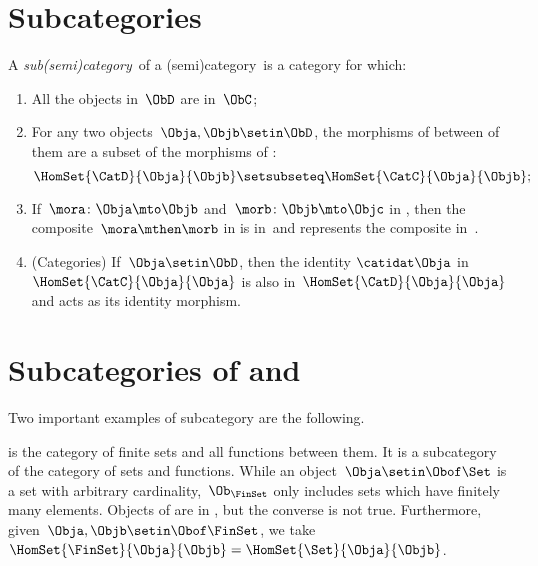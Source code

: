 
\section{Subcategories}
\label{sec:subcategories}


\begin{ctdefinition}[Subcategory]
    \label{def:subcategory}
    A \emph{sub(semi)category}~\CatD of a (semi)category~\CatC is a category for which:
    \begin{enumerate}
        \item All the objects in~$\ObD$ are in~$\ObC$;
        \item For any two objects~$\Obja,\Objb\setin \ObD$,
              the morphisms of \CatD between of them are a subset of the morphisms of \CatC:
              \begin{equation}
                  \HomSet{\CatD}{\Obja}{\Objb}\setsubseteq \HomSet{\CatC}{ \Obja}{\Objb};
              \end{equation}
        \item If~$\mora \colon \Obja \mto \Objb$ and~$\morb\colon \Objb\mto \Objc$ in \CatD, then the composite~$\mora \mthen \morb$ in \CatC is in~\CatD and represents the composite in~\CatD.
        \item (Categories) If~$\Obja\setin \ObD$, then the identity $\catidat\Obja$ in $\HomSet{\CatC}{\Obja}{\Obja}$ is also in~$\HomSet{\CatD}{\Obja}{\Obja}$ and acts as its identity morphism.
    \end{enumerate}
\end{ctdefinition}

\section{Subcategories of \Rel and \Set}

Two important examples of subcategory are the following.

\begin{example}[\FinSet]
    \label{ex:FinSet}
    \FinSet is the category of finite sets and all functions between them.
    It is a subcategory of the category \Set of sets and functions.
    While an object~$\Obja \setin \Obof\Set$ is a set with arbitrary cardinality,~$\Ob_{\FinSet}$ only includes sets which have finitely many elements.
    Objects of \FinSet are in \Set, but the converse is not true.
    Furthermore, given~$\Obja,\Objb\setin \Obof\FinSet$, we take~$\HomSet{\FinSet}{\Obja}{\Objb} =\HomSet{\Set}{\Obja}{\Objb}$.
\end{example}


